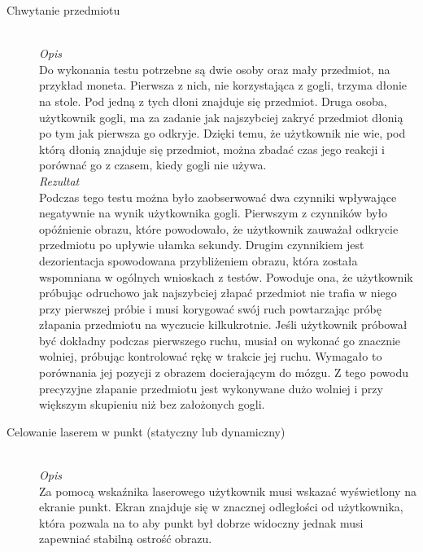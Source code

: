 \documentclass[a4paper,11pt,twoside]{report}
\theoremstyle{definition}
\begin{document}
\begin{description}
\item[Chwytanie przedmiotu] \hfill \\
\textit{Opis} \\
Do wykonania testu potrzebne są dwie osoby oraz mały przedmiot, na przykład moneta. Pierwsza z nich, nie korzystająca z gogli, trzyma dłonie na stole. Pod jedną z tych dłoni znajduje się przedmiot. Druga osoba, użytkownik gogli, ma za zadanie jak najszybciej zakryć przedmiot dłonią po tym jak pierwsza go odkryje. Dzięki temu, że użytkownik nie wie, pod którą dłonią znajduje się przedmiot, można zbadać czas jego reakcji i porównać go z czasem, kiedy gogli nie używa. \\

\textit{Rezultat} \\
Podczas tego testu można było zaobserwować dwa czynniki wpływające negatywnie na wynik użytkownika gogli. Pierwszym z czynników było opóźnienie obrazu, które powodowało, że użytkownik zauważał odkrycie przedmiotu po upływie ułamka sekundy. Drugim czynnikiem jest dezorientacja spowodowana przybliżeniem obrazu, która została wspomniana w ogólnych wnioskach z testów. Powoduje ona, że użytkownik próbując odruchowo jak najszybciej złapać przedmiot nie trafia w niego przy pierwszej próbie i musi korygować swój ruch powtarzając próbę złapania przedmiotu na wyczucie kilkukrotnie. Jeśli użytkownik próbował być dokładny podczas pierwszego ruchu, musiał on wykonać go znacznie wolniej, próbując kontrolować rękę w trakcie jej ruchu. Wymagało to porównania jej pozycji z obrazem docierającym do mózgu. Z tego powodu precyzyjne złapanie przedmiotu jest wykonywane dużo wolniej i przy większym skupieniu niż bez założonych gogli.

\item[Celowanie laserem w punkt (statyczny lub dynamiczny)] \hfill \\
\textit{Opis} \\
Za pomocą wskaźnika laserowego użytkownik musi wskazać wyświetlony na ekranie punkt. Ekran znajduje się w znacznej odległości od użytkownika, która pozwala na to aby punkt był dobrze widoczny jednak musi zapewniać stabilną ostrość obrazu.


\end{description}
\end{document}
